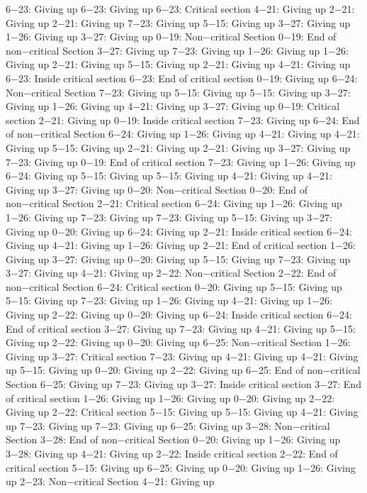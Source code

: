 6−23: Giving up
6−23: Giving up
6−23: Critical section
4−21: Giving up
2−21: Giving up
2−21: Giving up
7−23: Giving up
5−15: Giving up
3−27: Giving up
1−26: Giving up
3−27: Giving up
0−19: Non−critical Section
0−19: End of non−critical Section
3−27: Giving up
7−23: Giving up
1−26: Giving up
1−26: Giving up
2−21: Giving up
5−15: Giving up
2−21: Giving up
4−21: Giving up
6−23: Inside critical section
6−23: End of critical section
0−19: Giving up
6−24: Non−critical Section
7−23: Giving up
5−15: Giving up
5−15: Giving up
3−27: Giving up
1−26: Giving up
4−21: Giving up
3−27: Giving up
0−19: Critical section
2−21: Giving up
0−19: Inside critical section
7−23: Giving up
6−24: End of non−critical Section
6−24: Giving up
1−26: Giving up
4−21: Giving up
4−21: Giving up
5−15: Giving up
2−21: Giving up
2−21: Giving up
3−27: Giving up
7−23: Giving up
0−19: End of critical section
7−23: Giving up
1−26: Giving up
6−24: Giving up
5−15: Giving up
5−15: Giving up
4−21: Giving up
4−21: Giving up
3−27: Giving up
0−20: Non−critical Section
0−20: End of non−critical Section
2−21: Critical section
6−24: Giving up
1−26: Giving up
1−26: Giving up
7−23: Giving up
7−23: Giving up
5−15: Giving up
3−27: Giving up
0−20: Giving up
6−24: Giving up
2−21: Inside critical section
6−24: Giving up
4−21: Giving up
1−26: Giving up
2−21: End of critical section
1−26: Giving up
3−27: Giving up
0−20: Giving up
5−15: Giving up
7−23: Giving up
3−27: Giving up
4−21: Giving up
2−22: Non−critical Section
2−22: End of non−critical Section
6−24: Critical section
0−20: Giving up
5−15: Giving up
5−15: Giving up
7−23: Giving up
1−26: Giving up
4−21: Giving up
1−26: Giving up
2−22: Giving up
0−20: Giving up
6−24: Inside critical section
6−24: End of critical section
3−27: Giving up
7−23: Giving up
4−21: Giving up
5−15: Giving up
2−22: Giving up
0−20: Giving up
6−25: Non−critical Section
1−26: Giving up
3−27: Critical section
7−23: Giving up
4−21: Giving up
4−21: Giving up
5−15: Giving up
0−20: Giving up
2−22: Giving up
6−25: End of non−critical Section
6−25: Giving up
7−23: Giving up
3−27: Inside critical section
3−27: End of critical section
1−26: Giving up
1−26: Giving up
0−20: Giving up
2−22: Giving up
2−22: Critical section
5−15: Giving up
5−15: Giving up
4−21: Giving up
7−23: Giving up
7−23: Giving up
6−25: Giving up
3−28: Non−critical Section
3−28: End of non−critical Section
0−20: Giving up
1−26: Giving up
3−28: Giving up
4−21: Giving up
2−22: Inside critical section
2−22: End of critical section
5−15: Giving up
6−25: Giving up
0−20: Giving up
1−26: Giving up
2−23: Non−critical Section
4−21: Giving up
